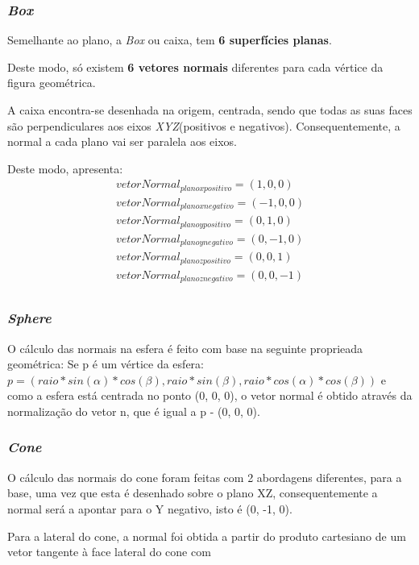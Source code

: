 \documentclass[relatorio.tex]{subfiles}
\begin{document}
\subsubsection{\textit{Box}}

Semelhante ao plano, a \textit{Box} ou caixa, 
tem \textbf{6 superfícies planas}.

Deste modo, só existem \textbf{6 vetores normais} 
diferentes para cada vértice da figura geométrica.

A caixa encontra-se desenhada na origem, centrada,
sendo que todas as suas faces são perpendiculares
aos eixos \textit{XYZ}(positivos e negativos).
Consequentemente, a normal a cada plano vai ser 
paralela aos eixos.

Deste modo, apresenta:
\begin{eqnarray}
    vetorNormal_{plano x positivo} = (1,0,0) \\
    vetorNormal_{plano x negativo} = (-1,0,0) \\
    vetorNormal_{plano y positivo} = (0,1,0) \\
    vetorNormal_{plano y negativo} = (0,-1,0) \\
    vetorNormal_{plano z positivo} = (0,0,1) \\
    vetorNormal_{plano z negativo} = (0,0,-1) \\
\end{eqnarray}

\subsubsection{\textit{Sphere}}
O cálculo das normais na esfera é feito com base na seguinte proprieada
geométrica:
Se p é um vértice da esfera:
$ p = (raio * sin(\alpha) * cos(\beta), raio * sin(\beta), raio * cos(\alpha) * cos(\beta))$
e como a esfera está centrada no ponto (0, 0, 0), o vetor normal é obtido através
da normalização do vetor n, que é igual a p - (0, 0, 0).

\subsubsection{\textit{Cone}}
O cálculo das normais do cone foram feitas com 2 abordagens diferentes,
para a base, uma vez que esta é desenhado sobre o plano XZ, consequentemente
a normal será a apontar para o Y negativo, isto é (0, -1, 0).

Para a lateral do cone, a normal foi obtida a partir do produto cartesiano
de um vetor tangente à face lateral do cone com 
\end{document}
